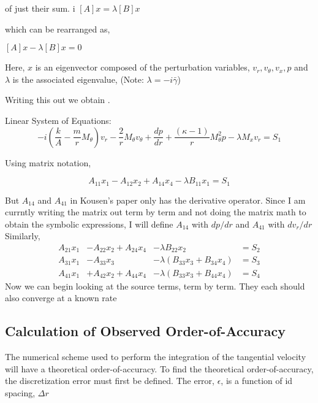 \documentclass[a4paper]{report}
\begin{document}
of just their sum.
i
$ [A]{x} = \lambda [B] {x} $

which can be rearranged as,

$ [A]{x} - \lambda [B] {x} = 0$

Here, $x$ is an eigenvector composed of the perturbation variables, $v_r,v_{\theta},v_x,p$ and $\lambda$ is the associated eigenvalue, (Note: $\lambda = -i \bar{\gamma}$)

Writing this out we obtain .

Linear System of Equations:
\begin{equation}
    -
    i \left(
        \frac{k}{A} - \frac{m}{r} M_{\theta}
    \right)
    v_r 
    -
    \frac{2}{r} M_{\theta} v_{\theta} 
    +
    \frac{dp}{dr} 
    +
    \frac{(\kappa - 1)}{r} M_{\theta}^2 p
    -
    \lambda M_x v_r =S_1
\end{equation}

Using matrix notation,

\begin{equation}
    A_{11}
    x_1 
    -
    A_{12} x_2 
    +
    A_{14} x_4
    -
    \lambda B_{11} x_1 = S_1
\end{equation}


But $A_{14}$ and $A_{41}$ in Kousen's paper only has the derivative operator.
Since I am currntly writing the matrix out term by term and not doing the matrix 
math to obtain the symbolic expressions, I will define $A_{14}$ with $dp/dr$ 
and $A_{41}$ with $dv_r/dr$
Similarly,
\begin{align}
    A_{21} x_1 &-
    A_{22} x_2 +
    A_{24} x_4 &-
    \lambda B_{22} x_2 &= S_2 \\
    A_{31} x_1 &-
    A_{33} x_3 &-
    \lambda (B_{33} x_3 + B_{34} x_4) &= S_3\\
    A_{41} x_1 &+
    A_{42} x_2 +
    A_{44} x_4 &- 
    \lambda (B_{33} x_3 + B_{44} x_4) &= S_4
\end{align}
Now we can begin looking at the source terms, term by term. They each should also
converge at a known rate





\subsection{Calculation of Observed Order-of-Accuracy}
The numerical scheme used to perform the integration of the tangential velocity
will have a theoretical order-of-accuracy. To find the theoretical 
order-of-accuracy, the discretization error must first be defined. The error, 
$\epsilon$, is a function of id spacing, $\Delta r$
\end{document}
